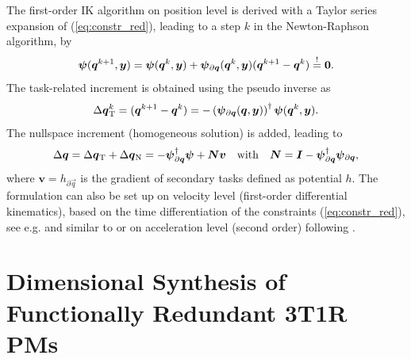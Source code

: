 \documentclass[
	graybox,
	vecphys] %
	{svmult}
\newcommand{\bm}[1]{\boldsymbol{#1}}
\newcommand{\vecResR}[0]{\vec{\psi}}
\begin{document}
The first-order IK algorithm on position level is derived with a Taylor series expansion of (\ref{eq:constr_red}), leading to a step $k$ in the Newton-Raphson algorithm, by
%
\vspace{-0.2cm}
\begin{equation}
\vecResR(\vec{q}^{k+1},\vec{y}) =
\vecResR(\vec{q}^{k},\vec{y})
+
\vecResR_{\partial \vec{q}}(\vec{q}^k,\vec{y}) (\vec{q}^{k+1} - \vec{q}^k)
\overset{!}{=}
\vec{0}.
\vspace{-0.2cm}
\end{equation}
%
The task-related increment is obtained using the pseudo inverse as 
%
\vspace{-0.2cm}
\begin{equation}
\Delta \vec{q}^k_{\mathrm{T}}
=
(\vec{q}^{k+1} - \vec{q}^k)
=
- 
\left(\vecResR_{\partial \vec{q}}(\vec{q},\vec{y})\right)^{\dagger}
\vecResR(\vec{q}^{k},\vec{y}).
\label{equ:deltaq_psi}
\vspace{-0.2cm}
\end{equation}
%
The nullspace increment (homogeneous solution) is added, leading to
%
\vspace{-0.2cm}
\begin{equation}
{\Delta}\vec{q}
=
{\Delta}\vec{q}_{\mathrm{T}} + {\Delta}\vec{q}_{\mathrm{N}}
=
-\vecResR_{\partial\vec{q}}^{\dagger} \vecResR +  \vec{N} \bm{v}
\quad \mathrm{with} \quad
\vec{N}=\vec{I}-\vecResR_{\partial\vec{q}}^{\dagger}\vecResR_{\partial\vec{q}},
\label{equ:nullspace}
\vspace{-0.2cm}
\end{equation}
where $\bm{v}{=}h_{\partial\vec{q}}$ is the gradient of secondary tasks defined as potential $h$.
%
The formulation can also be set up on velocity level (first-order differential kinematics), based on the time differentiation of the constraints (\ref{eq:constr_red}), see e.g. \cite{Merlet2006} and similar to \cite{Gogu2008,SantosSil2017,AgarwalNasBan2016} or on acceleration level (second order) following \cite{ReiterMueGat2018,SchapplerOrt2021}.
\vspace{-0.4cm}


\section{Dimensional Synthesis of Functionally Redundant 3T1R PMs}
\label{sec:synthesis}
\end{document}
